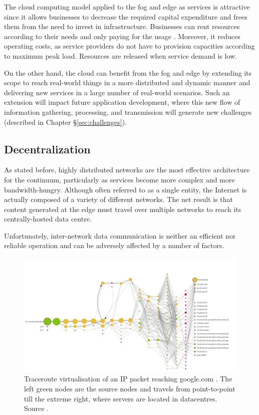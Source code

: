 The cloud computing model applied to the fog and edge as services is attractive since it allows businesses to decrease the required capital expenditure and frees them from the need to invest in infrastructure. Businesses can rent resources according to their needs and only paying for the usage \cite{cloud-iot}. Moreover, it reduces operating costs, as service providers do not have to provision capacities according to maximum peak load. Resources are released when service demand is low.

On the other hand, the cloud can benefit from the fog and edge by extending its scope to reach real-world things in a more distributed and dynamic manner and delivering new services in a large number of real-world scenarios. Such an extension will impact future application development, where this new flow of information gathering, processing, and transmission will generate new challenges (described in Chapter §\ref{sec:challenges}).

\subsection{Decentralization}

As stated before, highly distributed networks are the most effective architecture for the continuum, particularly as services become more complex and more bandwidth-hungry. Although often referred to as a single entity, the Internet is actually composed of a variety of different networks. The net result is that content generated at the edge must travel over multiple networks to reach its centrally-hosted data centre.

Unfortunately, inter-network data communication is neither an efficient nor reliable operation and can be adversely affected by a number of factors.

\begin{figure}[h]
\centering
\includegraphics[width=\columnwidth]{figures/traceroute}
\caption{Traceroute virtualisation of an IP packet reaching google.com \label{fig:traceroute}. The left green nodes are the source nodes and travels from point-to-point till the extreme right, where servers are located in datacentres. Source \cite{traceroute-google}.}
\end{figure}

